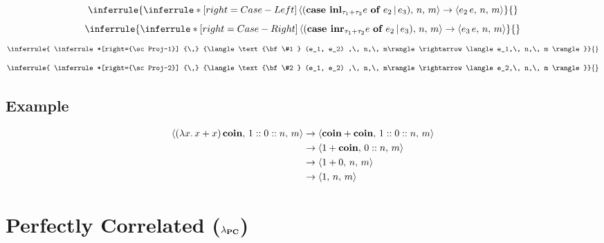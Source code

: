 \documentclass{article}
\begin{document}
\begin{multicols}{2}
				\begin{equation*}
				\inferrule{
				\inferrule*[right={\sc Case-Left}]
				{\,}
				{\langle (\text{\bf case } {\bf inl}_{\tau_1 + \tau_2} e \text{ \bf of } e_2 \,|\, e_3) ,\, n,\, m\rangle \rightarrow \langle e_2\, e,\, n,\, m \rangle}}
				{}
			\end{equation*}
				\begin{equation*}
				\inferrule{
				\inferrule*[right={\sc Case-Right}]
				{\,}
				{\langle (\text{\bf case } {\bf inr}_{\tau_1 + \tau_2} e \text{ \bf of } e_2 \,|\, e_3) ,\, n,\, m\rangle \rightarrow \langle e_3\, e,\, n,\, m \rangle}}
				{}
			\end{equation*}
				\begin{equation*}
				\inferrule{
				\inferrule*[right={\sc Proj-1}]
				{\,}
				{\langle \text{\bf \#1 } (e_1, e_2) ,\, n,\, m\rangle \rightarrow \langle e_1,\, n,\, m \rangle}}
				{}
			\end{equation*}
				\begin{equation*}
				\inferrule{
				\inferrule*[right={\sc Proj-2}]
				{\,}
				{\langle \text{\bf \#2 } (e_1, e_2) ,\, n,\, m\rangle \rightarrow \langle e_2,\, n,\, m \rangle}}
				{}
			\end{equation*}
		\end{multicols}


	\subsection{Example}
			\begin{equation*}
				\begin{split}
					\langle (\lambda x.\, x + x )\, {\bf coin},\, 1::0::n,\, m\rangle
					&\rightarrow \langle {\bf coin} + {\bf coin},\, 1::0::n,\, m\rangle \\
					&\rightarrow \langle 1 + {\bf coin},\, 0::n,\, m\rangle \\
					&\rightarrow \langle 1 + 0,\, n,\, m\rangle \\
					&\rightarrow \langle 1,\, n,\, m\rangle \\
				\end{split}
			\end{equation*}
			
	\newpage
	\section{Perfectly Correlated ($\lambda_{\bf PC}$)}
\end{document}
